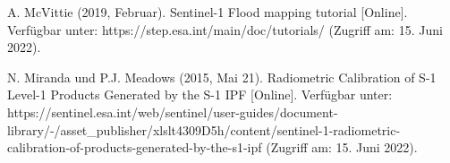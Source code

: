 \begin{thebibliography}{1}
A. McVittie (2019, Februar). Sentinel-1 Flood mapping tutorial [Online]. Verfügbar unter: 
https://step.esa.int/main/doc/tutorials/
(Zugriff am: 15. Juni 2022).

N. Miranda und P.J. Meadows (2015, Mai 21). Radiometric Calibration of S-1 Level-1 Products Generated by the S-1 IPF [Online]. Verfügbar unter: 
https://sentinel.esa.int/web/sentinel/user-guides/document-library/-/asset\_publisher/xlslt4309D5h/content/sentinel-1-radiometric-calibration-of-products-generated-by-the-s1-ipf
(Zugriff am: 15. Juni 2022).

\end{thebibliography}